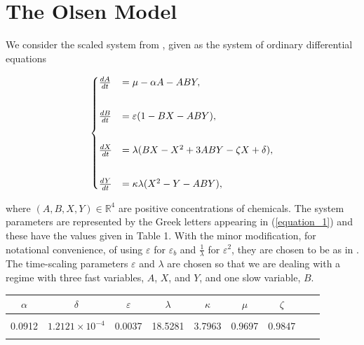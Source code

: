 \documentclass{ws-ijbc}
\begin{document}
\section{The Olsen Model}

We consider the scaled system from \cite{Rescaling}, given as the system of ordinary differential equations
    
\begin{equation}
\begin{aligned}
\begin{cases}
\frac{dA}{dt} &= \mu - \alpha A - ABY, \\ \vspace{2mm}\\
\frac{dB}{dt} &= \varepsilon(1-BX - ABY), \\ \vspace{2mm}\\
\frac{dX}{dt} &= \lambda(BX - X^2 +3ABY - \zeta X + \delta), \\ \vspace{2mm}\\
\frac{dY}{dt} &= \kappa\lambda(X^2 - Y - ABY),
\end{cases}
\end{aligned}
\label{equation_1}
\end{equation}
    
\noindent
where $(A, B, X, Y)\in\mathbb{R}^{4}$ are positive concentrations of chemicals.  The system parameters are represented by the Greek letters appearing in (\ref{equation_1}) and these have the values given in Table 1.  With the minor modification, for notational convenience, of using $\varepsilon$ for $\varepsilon_{b}$ and $\frac{1}{\lambda}$ for $\varepsilon^{2}$, they are chosen to be as in \cite{Rescaling}.  The time-scaling parameters $\varepsilon$ and $\lambda$ are chosen so that we are dealing with a regime with three fast variables, $A$, $X$, and $Y$, and one slow variable, $B$.

\begin{table}[h]
{\begin{tabular}{c  c  c  c  c  c  c  c  c} \\[-2pt]
\toprule
$\alpha$ & $\delta$ & $\varepsilon$ & $\lambda$ & $\kappa$ & $\mu$ & $\zeta$ \\[6pt]
\hline\\[-2pt]
0.0912 & $1.2121 \times 10^{-4}$ & 0.0037 & 18.5281 & 3.7963 & 0.9697 & 0.9847\\[1pt]
\botrule
\end{tabular}}
\end{table}
    
\end{document}
